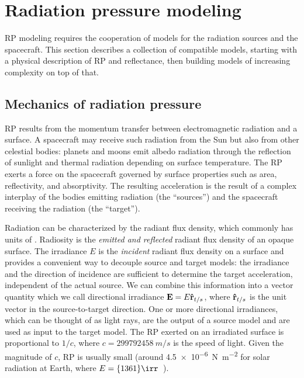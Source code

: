 \section{Radiation pressure modeling}

\gls{RP} modeling requires the cooperation of models for the radiation sources and the spacecraft. This section describes a collection of compatible models, starting with a physical description of \gls{RP} and reflectance, then building models of increasing complexity on top of that.

\subsection{Mechanics of radiation pressure}
\label{subsec:general-rp-mechanics}

\gls{RP} results from the momentum transfer between electromagnetic radiation and a surface. A spacecraft may receive such radiation from the Sun but also from other celestial bodies: planets and moons emit albedo radiation through the reflection of sunlight and thermal radiation depending on surface temperature. The \gls{RP} exerts a force on the spacecraft governed by surface properties such as area, reflectivity, and absorptivity. The resulting acceleration is the result of a complex interplay of the bodies emitting radiation (the ``sources'') and the spacecraft receiving the radiation (the ``target'').

Radiation can be characterized by the radiant flux density, which commonly has units of \unit{\irr}. Radiosity is the \emph{emitted and reflected} radiant flux density of an opaque surface. The irradiance $E$ is the \emph{incident} radiant flux density on a surface and provides a convenient way to decouple source and target models: the irradiance and the direction of incidence are sufficient to determine the target acceleration, independent of the actual source. We can combine this information into a vector quantity which we call directional irradiance $\vb E = E \vu r_{t/s}$, where $\vu r_{t/s}$ is the unit vector in the source-to-target direction. One or more directional irradiances, which can be thought of as light rays, are the output of a source model and are used as input to the target model. The \gls{RP} exerted on an irradiated surface is proportional to $1/c$, where $c = \qty{299792458}{m/s}$ is the speed of light. Given the magnitude of $c$, \gls{RP} is usually small (around \qty{4.5e-6}{\N\per\m\squared} for solar radiation at Earth, where $E=\qty{1361}{\irr}$~\cite{Kopp2011}).

